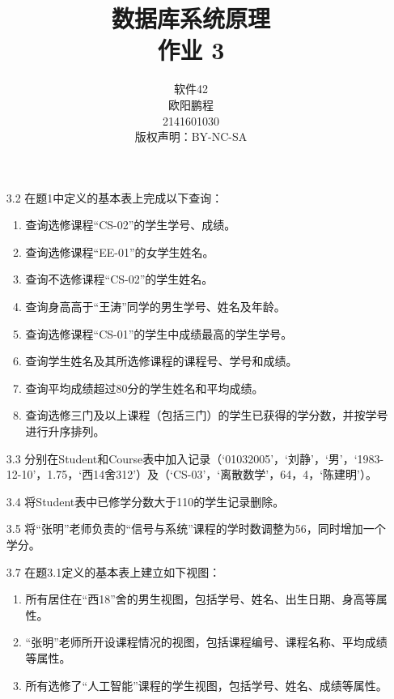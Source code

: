 \documentclass[]{ctexart}
\title{数据库系统原理 \\ 作业 3}
\author{软件42 \\ 欧阳鹏程 \\ 2141601030 \\ 版权声明：BY-NC-SA}
\begin{document}
\maketitle

\begin{enumerate}
	\item[3.2] 在题1中定义的基本表上完成以下查询：
	\begin{enumerate}
		\item 查询选修课程“CS-02”的学生学号、成绩。
		\item 查询选修课程“EE-01”的女学生姓名。
		\item 查询不选修课程“CS-02”的学生姓名。
		\item 查询身高高于“王涛”同学的男生学号、姓名及年龄。
		\item 查询选修课程“CS-01”的学生中成绩最高的学生学号。
		\item 查询学生姓名及其所选修课程的课程号、学号和成绩。
		\item 查询平均成绩超过80分的学生姓名和平均成绩。
		\item 查询选修三门及以上课程（包括三门）的学生已获得的学分数，并按学号进行升序排列。
	\end{enumerate}
	

	\item[3.3] 分别在Student和Course表中加入记录（‘01032005’，‘刘静’，‘男’，‘1983-12-10’，1.75，‘西14舍312’）及（‘CS-03’，‘离散数学’，64，4，‘陈建明’）。
	
	
	\item[3.4]
	将Student表中已修学分数大于110的学生记录删除。
	
	
	\item[3.5]
	将“张明”老师负责的“信号与系统”课程的学时数调整为56，同时增加一个学分。
	
	
	\item[3.7]
	在题3.1定义的基本表上建立如下视图：
	\begin{enumerate}
		\item 所有居住在“西18”舍的男生视图，包括学号、姓名、出生日期、身高等属性。
		\item “张明”老师所开设课程情况的视图，包括课程编号、课程名称、平均成绩等属性。
		\item 所有选修了“人工智能”课程的学生视图，包括学号、姓名、成绩等属性。
	\end{enumerate}
	
\end{enumerate}
\end{document}
